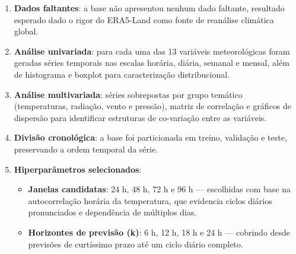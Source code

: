 \documentclass[
  brazilian,
  a4paper,
]{article}
\providecommand{\tightlist}{%
  \setlength{\itemsep}{0pt}\setlength{\parskip}{0pt}}
\begin{document}
\begin{enumerate}
\def\labelenumi{\arabic{enumi}.}
\item
  \textbf{Dados faltantes}: a base não apresentou nenhum dado faltante,
  resultado esperado dado o rigor do ERA5-Land como fonte de reanálise
  climática global.
\item
  \textbf{Análise univariada}: para cada uma das 13 variáveis
  meteorológicas foram geradas séries temporais nas escalas horária,
  diária, semanal e mensal, além de histograma e boxplot para
  caracterização distribucional.
\item
  \textbf{Análise multivariada}: séries sobrepostas por grupo temático
  (temperaturas, radiação, vento e pressão), matriz de correlação e
  gráficos de dispersão para identificar estruturas de co-variação entre
  as variáveis.
\item
  \textbf{Divisão cronológica}: a base foi particionada em treino,
  validação e teste, preservando a ordem temporal da série.
\item
  \textbf{Hiperparâmetros selecionados}:

  \begin{itemize}
  \tightlist
  \item
    \textbf{Janelas candidatas}: 24 h, 48 h, 72 h e 96 h --- escolhidas
    com base na autocorrelação horária da temperatura, que evidencia
    ciclos diários pronunciados e dependência de múltiplos dias.
  \item
    \textbf{Horizontes de previsão (k)}: 6 h, 12 h, 18 h e 24 h ---
    cobrindo desde previsões de curtíssimo prazo até um ciclo diário
    completo.
  \end{itemize}
\end{enumerate}
\end{document}
